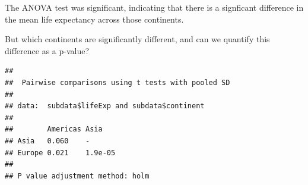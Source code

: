 \documentclass[]{book}
\makeatletter
\newenvironment{Shaded}{\begin{snugshade}}{\end{snugshade}}
\newcommand{\KeywordTok}[1]{\textcolor[rgb]{0.13,0.29,0.53}{\textbf{#1}}}
\newcommand{\DataTypeTok}[1]{\textcolor[rgb]{0.13,0.29,0.53}{#1}}
\newcommand{\DecValTok}[1]{\textcolor[rgb]{0.00,0.00,0.81}{#1}}
\newcommand{\StringTok}[1]{\textcolor[rgb]{0.31,0.60,0.02}{#1}}
\newcommand{\CommentTok}[1]{\textcolor[rgb]{0.56,0.35,0.01}{\textit{#1}}}
\newcommand{\OperatorTok}[1]{\textcolor[rgb]{0.81,0.36,0.00}{\textbf{#1}}}
\newcommand{\NormalTok}[1]{#1}
\newenvironment{kframe}{%
\medskip{}
\setlength{\fboxsep}{.8em}
 \def\at@end@of@kframe{}%
 \ifinner\ifhmode%
  \def\at@end@of@kframe{\end{minipage}}%
  \begin{minipage}{\columnwidth}%
 \fi\fi%
 \def\FrameCommand##1{\hskip\@totalleftmargin \hskip-\fboxsep
 \colorbox{shadecolor}{##1}\hskip-\fboxsep
     \hskip-\linewidth \hskip-\@totalleftmargin \hskip\columnwidth}%
 \MakeFramed {\advance\hsize-\width
   \@totalleftmargin\z@ \linewidth\hsize
   \@setminipage}}%
 {\par\unskip\endMakeFramed%
 \at@end@of@kframe}
\renewenvironment{Shaded}{\begin{kframe}}{\end{kframe}}
\makeatother
\begin{document}
The ANOVA test was significant, indicating that there is a signficant
difference in the mean life expectancy across those continents.

But which continents are significantly different, and can we quantify
this difference as a p-value?

\begin{Shaded}
\end{Shaded}

\begin{verbatim}
## 
##  Pairwise comparisons using t tests with pooled SD 
## 
## data:  subdata$lifeExp and subdata$continent 
## 
##        Americas Asia   
## Asia   0.060    -      
## Europe 0.021    1.9e-05
## 
## P value adjustment method: holm
\end{verbatim}

\begin{Shaded}
\end{Shaded}
\end{document}
